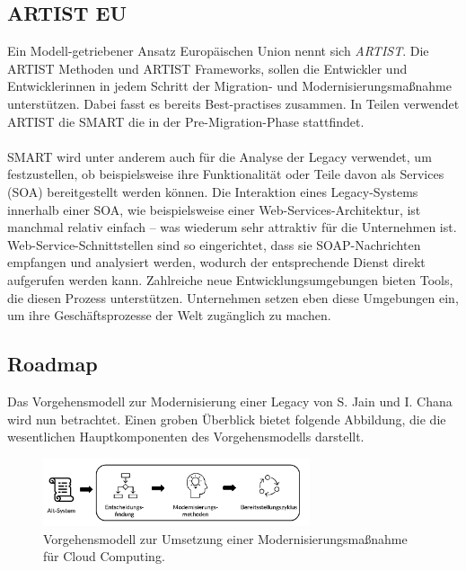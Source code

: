 \subsection{ARTIST EU} 
Ein Modell-getriebener Ansatz Europäischen Union nennt sich\textit{ \ac{ARTIST}}.\cite{artistEU} Die \acs{ARTIST} Methoden und  \acs{ARTIST} Frameworks, sollen die Entwickler und Entwicklerinnen in jedem Schritt der Migration- und Modernisierungsmaßnahme unterstützen. Dabei fasst es bereits Best-practises zusammen\cite{menychtas2014software}. In Teilen verwendet \acs{ARTIST} die \ac{SMART} die in der Pre-Migration-Phase stattfindet. \\\\
 \acs{SMART} wird unter anderem auch für die Analyse der Legacy verwendet, um festzustellen, ob beispielsweise ihre Funktionalität oder Teile davon als Services (\acs{SOA}) bereitgestellt werden können. Die Interaktion eines Legacy-Systems innerhalb einer \acs{SOA}, wie beispielsweise einer Web-Services-Architektur, ist manchmal relativ einfach – was wiederum sehr attraktiv für die Unternehmen ist. Web-Service-Schnittstellen sind so eingerichtet, dass sie SOAP-Nachrichten empfangen und analysiert werden, wodurch der entsprechende Dienst direkt aufgerufen werden kann. Zahlreiche neue Entwicklungsumgebungen bieten Tools, die diesen Prozess unterstützen. Unternehmen setzen eben diese Umgebungen  ein, um ihre Geschäftsprozesse der Welt zugänglich zu machen.\cite{lewis2005service} 
 
 
 
 
 
\subsection{Roadmap}
Das Vorgehensmodell zur Modernisierung einer Legacy von S. Jain und I. Chana \cite{ccRoadmap} wird  nun betrachtet. Einen groben Überblick bietet folgende Abbildung, die die wesentlichen Hauptkomponenten des Vorgehensmodells darstellt.


\begin{figure}[h] 
  \centering
  \includegraphics[width=0.7\textwidth]{Chapters/Vorgehensmodell/images/ccvorgehensmodell.png}
  \caption{Vorgehensmodell zur Umsetzung einer Modernisierungsmaßnahme für Cloud Computing. \cite{ccRoadmap}}
  \label{fig:picCCRoadmap}
\end{figure}

